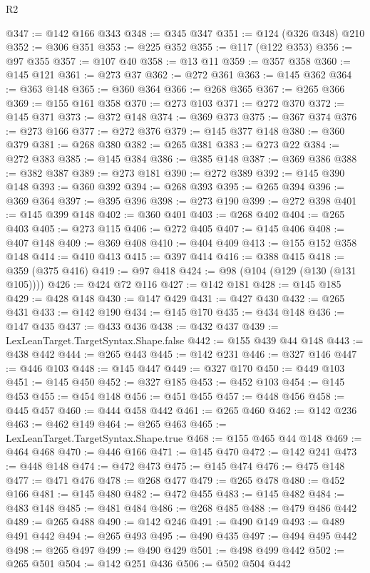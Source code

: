 \begin{lexlean}{R2}
\begin{coremodule}
@347 := @142 @166 @343
@348 := @345 @347
@351 := @124 (@326 @348) @210
@352 := @306 @351
@353 := @225 @352
@355 := @117 (@122 @353)
@356 := @97 @355
@357 := @107 @40
@358 := @13 @11
@359 := @357 @358
@360 := @145 @121
@361 := @273 @37
@362 := @272 @361
@363 := @145 @362
@364 := @363 @148
@365 := @360 @364
@366 := @268 @365
@367 := @265 @366
@369 := @155 @161 @358
@370 := @273 @103
@371 := @272 @370
@372 := @145 @371
@373 := @372 @148
@374 := @369 @373
@375 := @367 @374
@376 := @273 @166
@377 := @272 @376
@379 := @145 @377 @148
@380 := @360 @379
@381 := @268 @380
@382 := @265 @381
@383 := @273 @22
@384 := @272 @383
@385 := @145 @384
@386 := @385 @148
@387 := @369 @386
@388 := @382 @387
@389 := @273 @181
@390 := @272 @389
@392 := @145 @390 @148
@393 := @360 @392
@394 := @268 @393
@395 := @265 @394
@396 := @369 @364
@397 := @395 @396
@398 := @273 @190
@399 := @272 @398
@401 := @145 @399 @148
@402 := @360 @401
@403 := @268 @402
@404 := @265 @403
@405 := @273 @115
@406 := @272 @405
@407 := @145 @406
@408 := @407 @148
@409 := @369 @408
@410 := @404 @409
@413 := @155 @152 @358 @148
@414 := @410 @413
@415 := @397 @414
@416 := @388 @415
@418 := @359 (@375 @416)
@419 := @97 @418
@424 := @98 (@104 (@129 (@130 (@131 @105))))
@426 := @424 @72 @116
@427 := @142 @181
@428 := @145 @185
@429 := @428 @148
@430 := @147 @429
@431 := @427 @430
@432 := @265 @431
@433 := @142 @190
@434 := @145 @170
@435 := @434 @148
@436 := @147 @435
@437 := @433 @436
@438 := @432 @437
@439 := LexLeanTarget.TargetSyntax.Shape.false
@442 := @155 @439 @44 @148
@443 := @438 @442
@444 := @265 @443
@445 := @142 @231
@446 := @327 @146
@447 := @446 @103
@448 := @145 @447
@449 := @327 @170
@450 := @449 @103
@451 := @145 @450
@452 := @327 @185
@453 := @452 @103
@454 := @145 @453
@455 := @454 @148
@456 := @451 @455
@457 := @448 @456
@458 := @445 @457
@460 := @444 @458 @442
@461 := @265 @460
@462 := @142 @236
@463 := @462 @149
@464 := @265 @463
@465 := LexLeanTarget.TargetSyntax.Shape.true
@468 := @155 @465 @44 @148
@469 := @464 @468
@470 := @446 @166
@471 := @145 @470
@472 := @142 @241
@473 := @448 @148
@474 := @472 @473
@475 := @145 @474
@476 := @475 @148
@477 := @471 @476
@478 := @268 @477
@479 := @265 @478
@480 := @452 @166
@481 := @145 @480
@482 := @472 @455
@483 := @145 @482
@484 := @483 @148
@485 := @481 @484
@486 := @268 @485
@488 := @479 @486 @442
@489 := @265 @488
@490 := @142 @246
@491 := @490 @149
@493 := @489 @491 @442
@494 := @265 @493
@495 := @490 @435
@497 := @494 @495 @442
@498 := @265 @497
@499 := @490 @429
@501 := @498 @499 @442
@502 := @265 @501
@504 := @142 @251 @436
@506 := @502 @504 @442

\end{coremodule}
\end{lexlean}
